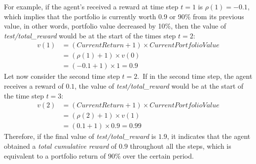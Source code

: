 \documentclass[../xlapes02]{subfiles}
\begin{document}
    For example, if the agent's received a reward at time step $t=1$ is $\rho(1)=-0.1$, which implies that the portfolio is currently worth $0.9$ or 90\% from its previous value, in other words, portfolio value decreased by 10\%, then the value of \emph{test/total\_reward} would be at the start of the times step $t=2$:
    \begin{equation}
        \label{eq:portfolio-value-example}
        \begin{split}
            v(1) &= (CurrentReturn+1)\times CurrentPortfolioValue  \\
            &= (\rho(1)+1)\times v(0) \\
            &= (-0.1+1)\times 1 = 0.9
        \end{split}
    \end{equation}
    Let now consider the second time step $t=2$.\ If in the second time step, the agent receives a reward of $0.1$, the value of \emph{test/total\_reward} would be at the start of the time step $t=3$:
    \begin{equation}
        \begin{split}
            v(2) &= (CurrentReturn+1)\times CurrentPortfolioValue  \\
            &= (\rho(2)+1)\times v(1) \\
            &= (0.1+1) \times 0.9 = 0.99
        \end{split}
    \end{equation}
    Therefore, if the final value of \emph{test/total\_reward} is $1.9$, it indicates that the agent obtained a \emph{total cumulative reward} of $0.9$ throughout all the steps, which is equivalent to a portfolio return of $90\%$ over the certain period.
\end{document}
